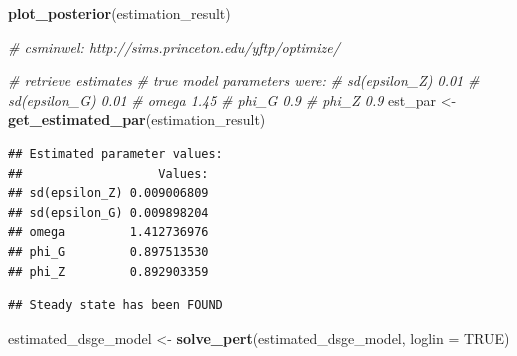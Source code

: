 \documentclass[12pt,a4paper,]{article}
\newcommand{\0}{\mathbf{0}}
\newenvironment{Shaded}{\begin{snugshade}}{\end{snugshade}}
\newcommand{\CommentTok}[1]{\textcolor[rgb]{0.56,0.35,0.01}{\textit{#1}}}
\newcommand{\DataTypeTok}[1]{\textcolor[rgb]{0.13,0.29,0.53}{#1}}
\newcommand{\KeywordTok}[1]{\textcolor[rgb]{0.13,0.29,0.53}{\textbf{#1}}}
\newcommand{\NormalTok}[1]{#1}
\newcommand{\OperatorTok}[1]{\textcolor[rgb]{0.81,0.36,0.00}{\textbf{#1}}}
\newcommand{\OtherTok}[1]{\textcolor[rgb]{0.56,0.35,0.01}{#1}}
\newcommand{\StringTok}[1]{\textcolor[rgb]{0.31,0.60,0.02}{#1}}
\begin{document}
\begin{Shaded}
\begin{Highlighting}[]
\KeywordTok{plot_posterior}\NormalTok{(estimation_result)}


\CommentTok{# csminwel: http://sims.princeton.edu/yftp/optimize/}

\CommentTok{# retrieve estimates}
\CommentTok{# true model parameters were:}
\CommentTok{# sd(epsilon_Z) 0.01}
\CommentTok{# sd(epsilon_G) 0.01}
\CommentTok{# omega 1.45}
\CommentTok{# phi_G 0.9}
\CommentTok{# phi_Z 0.9}
\NormalTok{est_par <-}\StringTok{ }\KeywordTok{get_estimated_par}\NormalTok{(estimation_result)}
\end{Highlighting}
\end{Shaded}

\begin{verbatim}
## Estimated parameter values:
##                   Values:
## sd(epsilon_Z) 0.009006809
## sd(epsilon_G) 0.009898204
## omega         1.412736976
## phi_G         0.897513530
## phi_Z         0.892903359
\end{verbatim}

\begin{Shaded}
\end{Shaded}

\begin{verbatim}
## Steady state has been FOUND
\end{verbatim}

\begin{Shaded}
\begin{Highlighting}[]
\NormalTok{estimated_dsge_model <-}\StringTok{ }\KeywordTok{solve_pert}\NormalTok{(estimated_dsge_model, }\DataTypeTok{loglin =} \OtherTok{TRUE}\NormalTok{)}
\end{Highlighting}
\end{Shaded}
\end{document}
